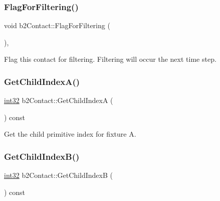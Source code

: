 \mbox{\label{classb2_contact_a44a3d32149021269eb9dfd4015c98e0d}} 
\subsubsection{\texorpdfstring{FlagForFiltering()}{FlagForFiltering()}}
{\footnotesize\ttfamily void b2\+Contact\+::\+Flag\+For\+Filtering (\begin{DoxyParamCaption}{ }\end{DoxyParamCaption})\hspace{0.3cm}{\ttfamily [inline]}, {\ttfamily [protected]}}



Flag this contact for filtering. Filtering will occur the next time step. 

\mbox{\label{classb2_contact_aa0b0739e6615ba8d38e9b5bd8761dc31}} 
\subsubsection{\texorpdfstring{GetChildIndexA()}{GetChildIndexA()}}
{\footnotesize\ttfamily \mbox{\hyperlink{b2_settings_8h_a43d43196463bde49cb067f5c20ab8481}{int32}} b2\+Contact\+::\+Get\+Child\+IndexA (\begin{DoxyParamCaption}{ }\end{DoxyParamCaption}) const\hspace{0.3cm}{\ttfamily [inline]}}



Get the child primitive index for fixture A. 

\mbox{\label{classb2_contact_aab201068e7f2cc31c69b1f5c8471d672}} 
\subsubsection{\texorpdfstring{GetChildIndexB()}{GetChildIndexB()}}
{\footnotesize\ttfamily \mbox{\hyperlink{b2_settings_8h_a43d43196463bde49cb067f5c20ab8481}{int32}} b2\+Contact\+::\+Get\+Child\+IndexB (\begin{DoxyParamCaption}{ }\end{DoxyParamCaption}) const\hspace{0.3cm}{\ttfamily [inline]}}



